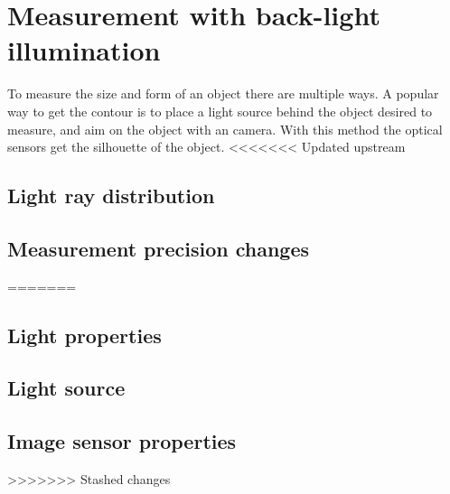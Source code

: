 \section{Measurement with back-light illumination}
To measure the size and form of an object there are multiple ways. A popular way to get the contour is to place a light source behind the object desired to measure, and aim on the object with an camera. With this method the optical sensors get the silhouette of the object. 
<<<<<<< Updated upstream
\subsection{Light ray distribution}

\subsection{Measurement precision changes}
=======
\subsection{Light properties}
\subsection{Light source}
\subsection{Image sensor properties}
>>>>>>> Stashed changes
